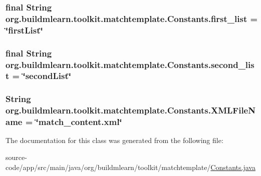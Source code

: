 \subsubsection[{\texorpdfstring{first\+\_\+list}{first_list}}]{\setlength{\rightskip}{0pt plus 5cm}final String org.\+buildmlearn.\+toolkit.\+matchtemplate.\+Constants.\+first\+\_\+list = \char`\"{}first\+List\char`\"{}\hspace{0.3cm}{\ttfamily [static]}}\hypertarget{classorg_1_1buildmlearn_1_1toolkit_1_1matchtemplate_1_1Constants_a5cce27593b60e7244c7662794ac830aa}{}\label{classorg_1_1buildmlearn_1_1toolkit_1_1matchtemplate_1_1Constants_a5cce27593b60e7244c7662794ac830aa}
\subsubsection[{\texorpdfstring{second\+\_\+list}{second_list}}]{\setlength{\rightskip}{0pt plus 5cm}final String org.\+buildmlearn.\+toolkit.\+matchtemplate.\+Constants.\+second\+\_\+list = \char`\"{}second\+List\char`\"{}\hspace{0.3cm}{\ttfamily [static]}}\hypertarget{classorg_1_1buildmlearn_1_1toolkit_1_1matchtemplate_1_1Constants_a445978428a1b2e1f2a2ca9fb7bacbc67}{}\label{classorg_1_1buildmlearn_1_1toolkit_1_1matchtemplate_1_1Constants_a445978428a1b2e1f2a2ca9fb7bacbc67}
\subsubsection[{\texorpdfstring{X\+M\+L\+File\+Name}{XMLFileName}}]{\setlength{\rightskip}{0pt plus 5cm}String org.\+buildmlearn.\+toolkit.\+matchtemplate.\+Constants.\+X\+M\+L\+File\+Name = \char`\"{}match\+\_\+content.\+xml\char`\"{}\hspace{0.3cm}{\ttfamily [static]}}\hypertarget{classorg_1_1buildmlearn_1_1toolkit_1_1matchtemplate_1_1Constants_aaa445a567c19f55fa2ee134f604db9c4}{}\label{classorg_1_1buildmlearn_1_1toolkit_1_1matchtemplate_1_1Constants_aaa445a567c19f55fa2ee134f604db9c4}


The documentation for this class was generated from the following file\+:\begin{DoxyCompactItemize}
\item 
source-\/code/app/src/main/java/org/buildmlearn/toolkit/matchtemplate/\hyperlink{matchtemplate_2Constants_8java}{Constants.\+java}\end{DoxyCompactItemize}
